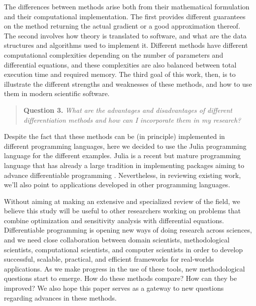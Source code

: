 The differences between methods arise both from their mathematical formulation and their computational implementation. 
The first provides different guarantees on the method returning the actual gradient or a good approximation thereof. 
The second involves how theory is translated to software, and what are the data structures and algorithms used to implement it. 
Different methods have different computational complexities depending on the number of parameters and differential equations, and these complexities are also balanced between total execution time and required memory. 
The third goal of this work, then, is to illustrate the different strengths and weaknesses of these methods, and how to use them in modern scientific software. 
\begin{quote}
    \textbf{Question 3. }
    \textit{What are the advantages and disadvantages of different differentiation methods and how can I incorporate them in my research?}
\end{quote}
Despite the fact that these methods can be (in principle) implemented in different programming languages, here we decided to use the Julia programming language for the different examples. 
Julia is a recent but mature programming language that has already a large tradition in implementing packages aiming to advance differentiable programming \cite{Bezanson_Karpinski_Shah_Edelman_2012, Julialang_2017}.
Nevertheless, in reviewing existing work, we'll also point to applications developed in other programming languages.

Without aiming at making an extensive and specialized review of the field, we believe this study will be useful to other researchers working on problems that combine optimization and sensitivity analysis with differential equations.
Differentiable programming is opening new ways of doing research across sciences, and we need close collaboration between domain scientists, methodological scientists, computational scientists, and computer scientists in order to develop successful, scalable, practical, and efficient frameworks for real-worlds applications.
As we make progress in the use of these tools, new methodological questions start to emerge. 
How do these methods compare? How can they be improved? 
We also hope this paper serves as a gateway to new questions regarding advances in these methods. 

